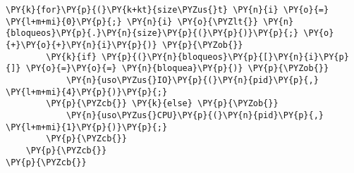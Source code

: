 \begin{Verbatim}[commandchars=\\\{\}]
    \PY{k}{for}\PY{p}{(}\PY{k+kt}{size\PYZus{}t} \PY{n}{i} \PY{o}{=} \PY{l+m+mi}{0}\PY{p}{;} \PY{n}{i} \PY{o}{\PYZlt{}} \PY{n}{bloqueos}\PY{p}{.}\PY{n}{size}\PY{p}{(}\PY{p}{)}\PY{p}{;} \PY{o}{+}\PY{o}{+}\PY{n}{i}\PY{p}{)} \PY{p}{\PYZob{}}
        \PY{k}{if} \PY{p}{(}\PY{n}{bloqueos}\PY{p}{[}\PY{n}{i}\PY{p}{]} \PY{o}{=}\PY{o}{=} \PY{n}{bloquea}\PY{p}{)} \PY{p}{\PYZob{}}
            \PY{n}{uso\PYZus{}IO}\PY{p}{(}\PY{n}{pid}\PY{p}{,} \PY{l+m+mi}{4}\PY{p}{)}\PY{p}{;}
        \PY{p}{\PYZcb{}} \PY{k}{else} \PY{p}{\PYZob{}}
            \PY{n}{uso\PYZus{}CPU}\PY{p}{(}\PY{n}{pid}\PY{p}{,} \PY{l+m+mi}{1}\PY{p}{)}\PY{p}{;}
        \PY{p}{\PYZcb{}}
    \PY{p}{\PYZcb{}}
\PY{p}{\PYZcb{}}
\end{Verbatim}